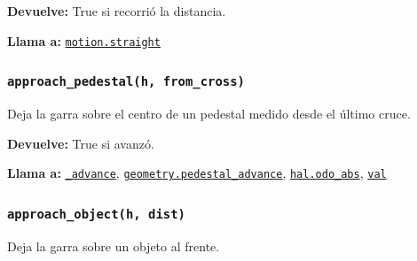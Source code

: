 \par{}\par\smallskip
\noindent\textbf{Devuelve:} True si recorrió la distancia.\par
\noindent\textbf{Llama a:} \hyperref[fn:motion:straight]{\texttt{motion.straight}}\par

\subsubsection{\texttt{approach\_\allowbreak{}pedestal(h, from\_\allowbreak{}cross)}}\label{fn:autonomous:approach-pedestal}
\noindent Deja la garra sobre el centro de un pedestal medido desde el último cruce.

\par{}\par\smallskip
\noindent\textbf{Devuelve:} True si avanzó.\par
\noindent\textbf{Llama a:} \hyperref[fn:autonomous:-advance]{\texttt{\_\allowbreak{}advance}}, \hyperref[fn:geometry:pedestal-advance]{\texttt{geometry.pedestal\_\allowbreak{}advance}}, \hyperref[fn:hal:odo-abs]{\texttt{hal.odo\_\allowbreak{}abs}}, \hyperref[fn:autonomous:val]{\texttt{val}}\par

\subsubsection{\texttt{approach\_\allowbreak{}object(h, dist)}}\label{fn:autonomous:approach-object}
\noindent Deja la garra sobre un objeto al frente.

